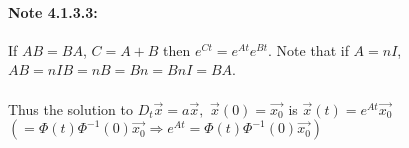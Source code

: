 \documentclass{article}
\begin{document}
\paragraph{Note 4.1.3.3:}
If $AB=BA$, $C=A+B$ then $e^{Ct}=e^{At}e^{Bt}$.  Note that if $A=nI$, $AB=nIB=nB=Bn=BnI=BA$.
\paragraph{}
Thus the solution to $D_t \vec{x}=a \vec{x},$ $\vec{x}(0) = \vec{x_0}$ is $\vec{x}(t)=e^{At} \vec{x_0
}$ $(=\Phi(t) \Phi ^{-1} (0) \vec{x_0} \Rightarrow e^{At} = \Phi(t) \Phi ^{-1} (0) \vec{x_0} )$
\end{document}
